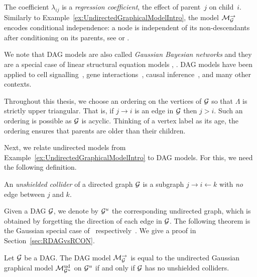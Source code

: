 The coefficient $\lambda_{ij}$ is a \emph{regression coefficient}, the effect of parent~$j$ on child~$i$.
Similarly to Example~\ref{ex:UndirectedGraphicalModelIntro}, the model $\mathcal{M}_{\mathcal{G}}^{\to}$ encodes conditional independence: a node is independent of its non-descendants after conditioning on its parents, see \cite[Chapter~13]{SullivantBook} or \cite{verma1990causal}. 

We note that DAG models are also called \emph{Gaussian Bayesian networks} and they are a special case of linear structural equation models \cite{drton2018algebraic}, \cite[Section~16.2]{SullivantBook}. DAG models have been applied to cell signalling~\cite{sachs2005causal}, gene interactions~\cite{friedman2000using}, causal inference~\cite{pearl2009causality}, and many other contexts.

\begin{remark} \label{rem:ParentsOlderThanChildren}
	Throughout this thesis, we choose an ordering on the vertices of $\mathcal{G}$ so that $\Lambda$ is strictly upper triangular. That is, if $j \to i$ is an edge in $\mathcal{G}$ then $j > i$.
	Such an ordering is possible as $\mathcal{G}$ is acyclic. Thinking of a vertex label as its age, the ordering ensures that parents are older than their children.
	\hfill\remSymbol
\end{remark}

Next, we relate undirected models from Example~\ref{ex:UndirectedGraphicalModelIntro} to DAG models. For this, we need the following definition.

\begin{defn} \label{defn:UnshieldedCollider}
	An \emph{unshielded collider} of a directed graph $\mathcal{G}$ is a subgraph $j \to i \leftarrow k$ with \emph{no} edge between $j$ and $k$.
	\hfill{}
\end{defn}

Given a DAG $\mathcal{G}$, we denote by $\mathcal{G}^u$ the corresponding undirected graph, which is obtained by forgetting the direction of each edge in $\mathcal{G}$.
The following theorem is the Gaussian special case of~\cite[Theorem~3.1]{andersson1997markov} respectively~\cite[Theorem~5.6]{frydenberg1990chain}. We give a proof in Section~\ref{sec:RDAGvsRCON}.

\begin{theorem}
	\label{thm:DAGCONeqChapter6}
	Let $\mathcal{G}$ be a DAG. The DAG model $\mathcal{M}_{\mathcal{G}}^{\to}$ is equal to the undirected Gaussian graphical model $\mathcal{M}^{\mathrm{ud}}_{\mathcal{G}^u}$ on $\mathcal{G}^u$ if and only if $\mathcal{G}$ has no unshielded colliders.
\end{theorem}


